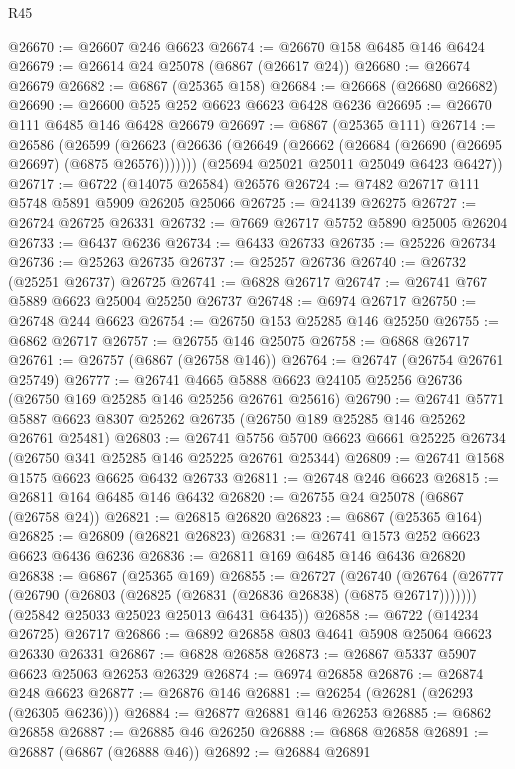 \begin{lexlean}{R45}
\begin{coremodule}
{@26670 := @26607 @246 @6623
@26674 := @26670 @158 @6485 @146 @6424
@26679 := @26614 @24 @25078 (@6867 (@26617 @24))
@26680 := @26674 @26679
@26682 := @6867 (@25365 @158)
@26684 := @26668 (@26680 @26682)
@26690 := @26600 @525 @252 @6623 @6623 @6428 @6236
@26695 := @26670 @111 @6485 @146 @6428 @26679
@26697 := @6867 (@25365 @111)
@26714 := @26586
    (@26599
      (@26623 (@26636 (@26649 (@26662 (@26684 (@26690 (@26695 @26697) (@6875 @26576)))))))
      (@25694 @25021 @25011 @25049 @6423 @6427))
@26717 := @6722 (@14075 @26584) @26576
@26724 := @7482 @26717 @111 @5748 @5891 @5909 @26205 @25066
@26725 := @24139 @26275
@26727 := @26724 @26725 @26331
@26732 := @7669 @26717 @5752 @5890 @25005 @26204
@26733 := @6437 @6236
@26734 := @6433 @26733
@26735 := @25226 @26734
@26736 := @25263 @26735
@26737 := @25257 @26736
@26740 := @26732 (@25251 @26737) @26725
@26741 := @6828 @26717
@26747 := @26741 @767 @5889 @6623 @25004 @25250 @26737
@26748 := @6974 @26717
@26750 := @26748 @244 @6623
@26754 := @26750 @153 @25285 @146 @25250
@26755 := @6862 @26717
@26757 := @26755 @146 @25075
@26758 := @6868 @26717
@26761 := @26757 (@6867 (@26758 @146))
@26764 := @26747 (@26754 @26761 @25749)
@26777 := @26741
    @4665
    @5888
    @6623
    @24105
    @25256
    @26736
    (@26750 @169 @25285 @146 @25256 @26761 @25616)
@26790 := @26741
    @5771
    @5887
    @6623
    @8307
    @25262
    @26735
    (@26750 @189 @25285 @146 @25262 @26761 @25481)
@26803 := @26741
    @5756
    @5700
    @6623
    @6661
    @25225
    @26734
    (@26750 @341 @25285 @146 @25225 @26761 @25344)
@26809 := @26741 @1568 @1575 @6623 @6625 @6432 @26733
@26811 := @26748 @246 @6623
@26815 := @26811 @164 @6485 @146 @6432
@26820 := @26755 @24 @25078 (@6867 (@26758 @24))
@26821 := @26815 @26820
@26823 := @6867 (@25365 @164)
@26825 := @26809 (@26821 @26823)
@26831 := @26741 @1573 @252 @6623 @6623 @6436 @6236
@26836 := @26811 @169 @6485 @146 @6436 @26820
@26838 := @6867 (@25365 @169)
@26855 := @26727
    (@26740
      (@26764 (@26777 (@26790 (@26803 (@26825 (@26831 (@26836 @26838) (@6875 @26717)))))))
      (@25842 @25033 @25023 @25013 @6431 @6435))
@26858 := @6722 (@14234 @26725) @26717
@26866 := @6892 @26858 @803 @4641 @5908 @25064 @6623 @26330 @26331
@26867 := @6828 @26858
@26873 := @26867 @5337 @5907 @6623 @25063 @26253 @26329
@26874 := @6974 @26858
@26876 := @26874 @248 @6623
@26877 := @26876 @146
@26881 := @26254 (@26281 (@26293 (@26305 @6236)))
@26884 := @26877 @26881 @146 @26253
@26885 := @6862 @26858
@26887 := @26885 @46 @26250
@26888 := @6868 @26858
@26891 := @26887 (@6867 (@26888 @46))
@26892 := @26884 @26891
}
\end{coremodule}
\end{lexlean}
